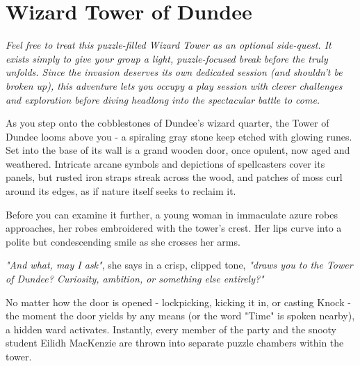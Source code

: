 \chapter*{Wizard Tower of Dundee}
\noindent \textit{Feel free to treat this puzzle-filled Wizard Tower as an optional side-quest. It exists simply to give your group a light, puzzle-focused break before the \hyperref[chapter:UnicornInvasionOfDundee]{} truly unfolds. Since the invasion deserves its own dedicated session (and shouldn't be broken up), this adventure lets you occupy a play session with clever challenges and exploration before diving headlong into the spectacular battle to come.}\\

\begin{DndReadAloud}
	As you step onto the cobblestones of Dundee's wizard quarter, the Tower of Dundee looms above you - a spiraling gray stone keep etched with glowing runes. Set into the base of its wall is a grand wooden door, once opulent, now aged and weathered. Intricate arcane symbols and depictions of spellcasters cover its panels, but rusted iron straps streak across the wood, and patches of moss curl around its edges, as if nature itself seeks to reclaim it.

	Before you can examine it further, a young woman in immaculate azure robes approaches, her robes embroidered with the tower's crest. Her lips curve into a polite but condescending smile as she crosses her arms.

	\textit{"And what, may I ask"}, she says in a crisp, clipped tone, \textit{"draws you to the Tower of Dundee? Curiosity, ambition, or something else entirely?"}
\end{DndReadAloud}

{\noindent\entryfont No matter how the door is opened - lockpicking, kicking it in, or casting Knock - the moment the door yields by any means (or the word "Time" is spoken nearby), a hidden ward activates. Instantly, every member of the party and the snooty student Eilidh MacKenzie are thrown into separate puzzle chambers within the tower.}

